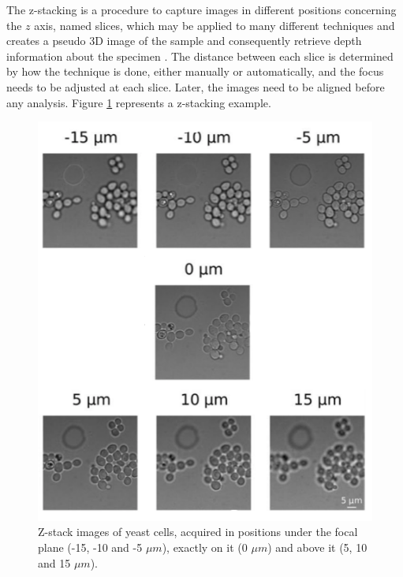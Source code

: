 The z-stacking is a procedure to capture images in different positions concerning the $z$ axis, named slices, which may be applied to many different techniques and creates a pseudo 3D image of the sample and consequently retrieve depth information about the specimen \cite{lawlor2019introduction}. The distance between each slice is determined by how the technique is done, either manually or automatically, and the focus needs to be adjusted at each slice. Later, the images need to be aligned before any analysis. Figure \ref{fig:z-stack_example} represents a z-stacking example.

\begin{figure}[H]
	\centering
	\caption{\label{fig:z-stack_example} Z-stack images of yeast cells, acquired in positions under the focal plane (-15, -10 and -5 $\mu m$), exactly on it (0 $\mu m$) and above it (5, 10 and 15 $\mu m$).}
	\begin{center}
	    \includegraphics[scale=0.5]{images/z-stack.png}
	\end{center}
	\centering
\end{figure}